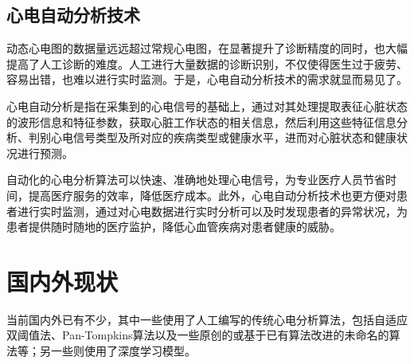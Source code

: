 \subsection{心电自动分析技术}\label{subsec:automatic-analysis}

动态心电图的数据量远远超过常规心电图，在显著提升了诊断精度的同时，也大幅提高了人工诊断的难度。人工进行大量数据的诊断识别，不仅使得医生过于疲劳、容易出错，也难以进行实时监测。于是，心电自动分析技术的需求就显而易见了。

心电自动分析是指在采集到的心电信号的基础上，通过对其处理提取表征心脏状态的波形信息和特征参数，获取心脏工作状态的相关信息，然后利用这些特征信息分析、判别心电信号类型及所对应的疾病类型或健康水平，进而对心脏状态和健康状况进行预测\cite{jiXindianxinhaozidongfenxiguanjianjishuyanjiu2006}。

自动化的心电分析算法可以快速、准确地处理心电信号，为专业医疗人员节省时间，提高医疗服务的效率，降低医疗成本。此外，心电自动分析技术也更方便对患者进行实时监测，通过对心电数据进行实时分析可以及时发现患者的异常状况，为患者提供随时随地的医疗监护，降低心血管疾病对患者健康的威胁。


\section{国内外\app 现状}\label{sec:status}

当前国内外已有不少\app ，其中一些使用了人工编写的传统心电分析算法\cite{zhengJiyukechuandaishebeideyidongjianhuAPP2019,wuYidongxindianjiancexitongdeyanjiuyushixian2018,chenYidongxindianxinxijianhuxitongjixindianjiancesuanfadeyanjiu2018,heJiyuyidongpingtaidexindianjianceyiliaoxitongdeshixian2017,gradlRealtimeECGMonitoring2012,wenRealtimeECGTelemonitoring2008}，包括自适应双阈值法\cite{chenYidongxindianxinxijianhuxitongjixindianjiancesuanfadeyanjiu2018}、Pan-Tompkins算法\cite{gradlRealtimeECGMonitoring2012}以及一些原创的或基于已有算法改进的未命名的算法等；另一些\app 则使用了深度学习模型\cite{wangJiyushenduxuexideyidongyuanchengxindianjiancexitongshejiyushixian2020,singhSmartECGMonitoring2022,chenJiyushenduxuexidexindianfenximoxingdeshejiyuyouhua2021,liuJiyuyidongzhongduanfenxidekechuandairouxingxindianjiancexitong2021,wangEnablingSmartPersonalized2014,jinPredictingCardiovascularDisease2009}。


